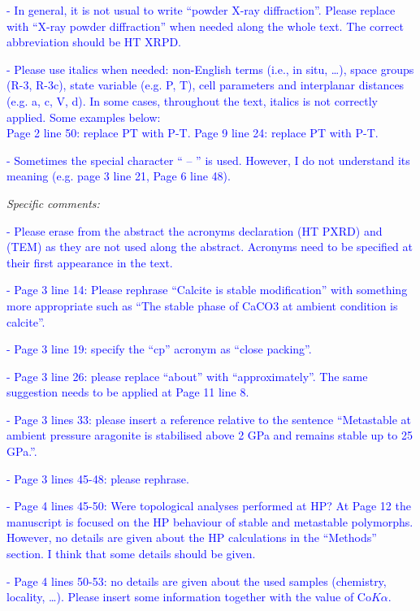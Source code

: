 \documentclass[a4paper]{article}
\begin{document}
\textcolor{blue}{
- In general, it is not usual to write “powder X-ray diffraction”. Please replace with “X-ray powder diffraction” when needed along the whole text. The correct abbreviation should be HT XRPD.
}

\textcolor{blue}{
- Please use italics when needed: non-English terms (i.e., in situ, …), space groups (R-3, R-3c), state variable (e.g. P, T), cell parameters and interplanar distances (e.g. a, c, V, d). In some cases, throughout the text, italics is not correctly applied. Some examples below: \\
 Page 2 line 50: replace PT with P-T.
 Page 9 line 24: replace PT with P-T.
 }
 
 \textcolor{blue}{
- Sometimes the special character “ – ” is used. However, I do not understand its meaning (e.g. page 3 line 21, Page 6 line 48).
}

\bigskip


\bigskip
{\it Specific comments:}

\textcolor{blue}{
- Please erase from the abstract the acronyms declaration (HT PXRD) and (TEM) as they are not used along the abstract. Acronyms need to be specified at their first appearance in the text.
}

\textcolor{blue}{
- Page 3 line 14: Please rephrase “Calcite is stable modification” with something more appropriate such as “The stable phase of CaCO3 at ambient condition is calcite”.
}

\textcolor{blue}{
- Page 3 line 19: specify the “cp” acronym as “close packing”.
}

\textcolor{blue}{
- Page 3 line 26: please replace “about” with “approximately”. The same suggestion needs to be applied at Page 11 line 8.
}

\textcolor{blue}{
- Page 3 lines 33: please insert a reference relative to the sentence “Metastable at ambient pressure aragonite is stabilised above 2 GPa and remains stable up to 25 GPa.”.
}

\textcolor{blue}{
- Page 3 lines 45-48: please rephrase.
}

\textcolor{blue}{
- Page 4 lines 45-50: Were topological analyses performed at HP? At Page 12 the manuscript is focused on the HP behaviour of stable and metastable polymorphs. However, no details are given about the HP calculations in the “Methods” section. I think that some details should be given.
}

\textcolor{blue}{
- Page 4 lines 50-53: no details are given about the used samples (chemistry, locality, …). Please insert some information together with the value of Co$K\alpha$.
}
\end{document}
